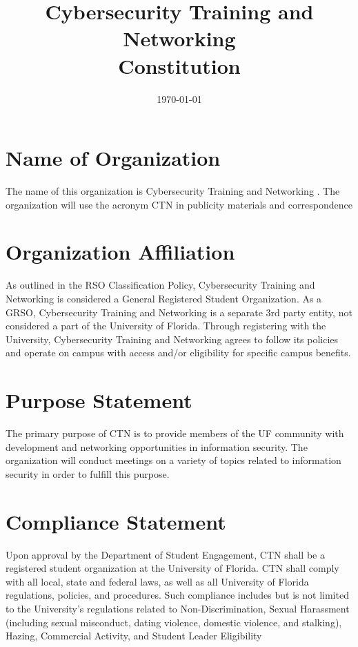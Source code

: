 \documentclass{article}
\title{Cybersecurity Training and Networking \\ Constitution}
\date{\monthyeardate\today}
\def\clubname{CTN }
\def\clubfullname{Cybersecurity Training and Networking }
\begin{document}
\maketitle

\section{Name of Organization}

The name of this organization is \clubfullname. The organization will use the acronym \clubname in publicity materials and correspondence


\section{Organization Affiliation}

As outlined in the RSO Classification Policy, \clubfullname is considered a General Registered Student Organization. As
a GRSO, \clubfullname is a separate 3rd party entity, not considered a part of the University of Florida. Through
registering with the University, \clubfullname agrees to follow its policies and operate on campus with access and/or
eligibility for specific campus benefits.


\section{Purpose Statement}

The primary purpose of \clubname is to provide members of the UF community with development and networking opportunities in information security. The organization will conduct meetings on a variety of topics related to information security in order to fulfill this purpose.


\section{Compliance Statement}

Upon approval by the Department of Student Engagement, \clubname shall be a registered student organization at the University of Florida. \clubname shall comply with all local, state and federal laws, as well as all University of Florida regulations, policies, and procedures. Such compliance includes but is not limited to the University’s regulations related to Non-Discrimination, Sexual Harassment (including sexual misconduct, dating violence, domestic violence, and stalking), Hazing, Commercial Activity, and Student Leader Eligibility
\end{document}
